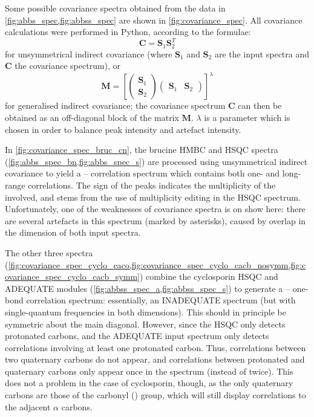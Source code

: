 Some possible covariance spectra obtained from the data in \cref{fig:abbs_spec,fig:abbss_spec} are shown in \cref{fig:covariance_spec}.
All covariance calculations were performed in Python, according to the formulae:
\begin{equation}
    \label{eq:covariance_unsymmetrical}
    \symbf{C} = \symbf{S}_1\symbf{S}_2^T
\end{equation}
for unsymmetrical indirect covariance (where $\symbf{S}_1$ and $\symbf{S}_2$ are the input spectra and $\symbf{C}$ the covariance spectrum), or
\begin{equation}
    \label{eq:covariance_generalised}
    \symbf{M} = \left[\begin{pmatrix}\symbf{S}_1 \\ \symbf{S}_2\end{pmatrix}
    \begin{pmatrix}\symbf{S}_1 & \symbf{S}_2 \end{pmatrix}\right]^\lambda
\end{equation}
for generalised indirect covariance; the covariance spectrum $\symbf{C}$ can then be obtained as an off-diagonal block of the matrix $\symbf{M}$.
$\lambda$ is a parameter which is chosen in order to balance peak intensity and artefact intensity\autocite{Snyder2009JPCA}.

In \cref{fig:covariance_spec_bruc_cn}, the brucine \nitrogen{} HMBC and \carbon{} HSQC spectra  (\cref{fig:abbs_spec_bn,fig:abbs_spec_s}) are processed using unsymmetrical indirect covariance to yield a \carbon{}--\nitrogen{} correlation spectrum which contains both one- and long-range correlations.\autocite{Martin2007JHC,Martin2007MRC}
The sign of the peaks indicates the multiplicity of the \carbon{} involved, and stems from the use of multiplicity editing in the \carbon{} HSQC spectrum.
Unfortunately, one of the weaknesses of covariance spectra is on show here: there are several artefacts in this spectrum (marked by asterisks), caused by overlap in the \proton{} dimension of both input spectra.

The other three spectra (\cref{fig:covariance_spec_cyclo_caco,fig:covariance_spec_cyclo_cacb_nosymm,fig:covariance_spec_cyclo_cacb_symm}) combine the cyclosporin \carbon{} HSQC and ADEQUATE modules (\cref{fig:abbss_spec_a,fig:abbss_spec_s}) to generate a \carbon{}--\carbon{} one-bond correlation spectrum: essentially, an INADEQUATE spectrum (but with single-quantum frequencies in both dimensions)\autocite{Martin2011MRC,Martin2011MRC2}.
This should in principle be symmetric about the main diagonal.
However, since the HSQC only detects protonated carbons, and the ADEQUATE input spectrum only detects correlations involving at least one protonated carbon.
Thus, correlations between two quaternary carbons do not appear, and correlations between protonated and quaternary carbons only appear once in the spectrum (instead of twice).
This does not a problem in the case of cyclosporin, though, as the only quaternary carbons are those of the carbonyl () group, which will still display correlations to the adjacent $\alpha$ carbons.

